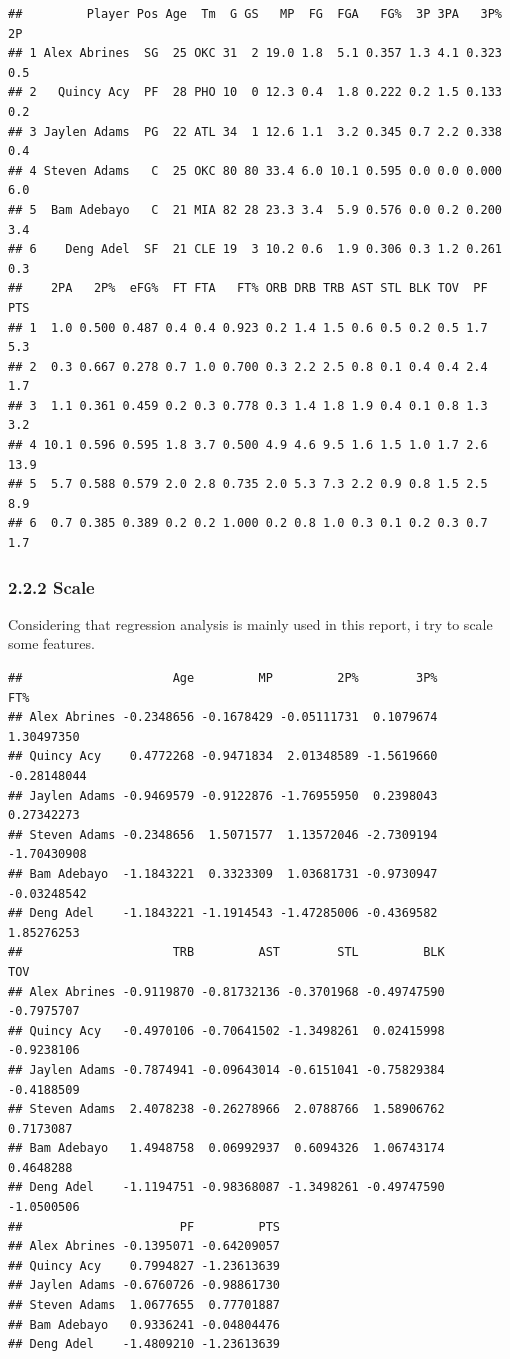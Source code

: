 \documentclass[]{article}
\begin{document}
\begin{verbatim}
##         Player Pos Age  Tm  G GS   MP  FG  FGA   FG%  3P 3PA   3P%  2P
## 1 Alex Abrines  SG  25 OKC 31  2 19.0 1.8  5.1 0.357 1.3 4.1 0.323 0.5
## 2   Quincy Acy  PF  28 PHO 10  0 12.3 0.4  1.8 0.222 0.2 1.5 0.133 0.2
## 3 Jaylen Adams  PG  22 ATL 34  1 12.6 1.1  3.2 0.345 0.7 2.2 0.338 0.4
## 4 Steven Adams   C  25 OKC 80 80 33.4 6.0 10.1 0.595 0.0 0.0 0.000 6.0
## 5  Bam Adebayo   C  21 MIA 82 28 23.3 3.4  5.9 0.576 0.0 0.2 0.200 3.4
## 6    Deng Adel  SF  21 CLE 19  3 10.2 0.6  1.9 0.306 0.3 1.2 0.261 0.3
##    2PA   2P%  eFG%  FT FTA   FT% ORB DRB TRB AST STL BLK TOV  PF  PTS
## 1  1.0 0.500 0.487 0.4 0.4 0.923 0.2 1.4 1.5 0.6 0.5 0.2 0.5 1.7  5.3
## 2  0.3 0.667 0.278 0.7 1.0 0.700 0.3 2.2 2.5 0.8 0.1 0.4 0.4 2.4  1.7
## 3  1.1 0.361 0.459 0.2 0.3 0.778 0.3 1.4 1.8 1.9 0.4 0.1 0.8 1.3  3.2
## 4 10.1 0.596 0.595 1.8 3.7 0.500 4.9 4.6 9.5 1.6 1.5 1.0 1.7 2.6 13.9
## 5  5.7 0.588 0.579 2.0 2.8 0.735 2.0 5.3 7.3 2.2 0.9 0.8 1.5 2.5  8.9
## 6  0.7 0.385 0.389 0.2 0.2 1.000 0.2 0.8 1.0 0.3 0.1 0.2 0.3 0.7  1.7
\end{verbatim}

\subsubsection{2.2.2 Scale}\label{scale}

Considering that regression analysis is mainly used in this report, i
try to scale some features.

\begin{verbatim}
##                     Age         MP         2P%        3P%         FT%
## Alex Abrines -0.2348656 -0.1678429 -0.05111731  0.1079674  1.30497350
## Quincy Acy    0.4772268 -0.9471834  2.01348589 -1.5619660 -0.28148044
## Jaylen Adams -0.9469579 -0.9122876 -1.76955950  0.2398043  0.27342273
## Steven Adams -0.2348656  1.5071577  1.13572046 -2.7309194 -1.70430908
## Bam Adebayo  -1.1843221  0.3323309  1.03681731 -0.9730947 -0.03248542
## Deng Adel    -1.1843221 -1.1914543 -1.47285006 -0.4369582  1.85276253
##                     TRB         AST        STL         BLK        TOV
## Alex Abrines -0.9119870 -0.81732136 -0.3701968 -0.49747590 -0.7975707
## Quincy Acy   -0.4970106 -0.70641502 -1.3498261  0.02415998 -0.9238106
## Jaylen Adams -0.7874941 -0.09643014 -0.6151041 -0.75829384 -0.4188509
## Steven Adams  2.4078238 -0.26278966  2.0788766  1.58906762  0.7173087
## Bam Adebayo   1.4948758  0.06992937  0.6094326  1.06743174  0.4648288
## Deng Adel    -1.1194751 -0.98368087 -1.3498261 -0.49747590 -1.0500506
##                      PF         PTS
## Alex Abrines -0.1395071 -0.64209057
## Quincy Acy    0.7994827 -1.23613639
## Jaylen Adams -0.6760726 -0.98861730
## Steven Adams  1.0677655  0.77701887
## Bam Adebayo   0.9336241 -0.04804476
## Deng Adel    -1.4809210 -1.23613639
\end{verbatim}
\end{document}
